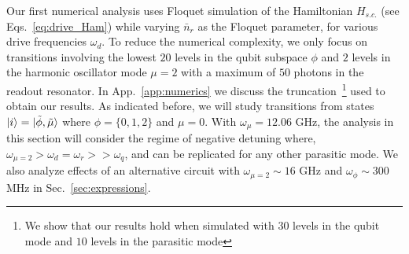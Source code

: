 \documentclass[%
reprint,
superscriptaddress,
 amsmath,amssymb,
 aps,
 prx,
longbibliography,
floatfix,
]{revtex4-2}
\newcommand{\sh}[1]{{\color{orange}{{}[SS: #1]}}}%
\begin{document}
Our first numerical analysis uses Floquet simulation of the Hamiltonian $H_{s.c.}$ (see Eqs.~\ref{eq:drive_Ham}) while varying $\bar n_r$ as the Floquet parameter, for various drive frequencies $\omega_d$. To reduce the numerical complexity, we only focus on transitions involving the lowest $20$ levels in the qubit subspace $\phi$ and $2$ levels in the harmonic oscillator mode $\mu=2$ with a maximum of $50$ photons in the readout resonator. In App.~\ref{app:numerics} we discuss the truncation~\footnote{We show that our results hold when simulated with $30$ levels in the qubit mode and $10$ levels in the parasitic mode} used to obtain our results. %
As indicated before, we will study transitions from states $\ket{i} =\ket{\tilde{\phi}, \tilde{\mu}}$ where $\phi=\{0,1,2\}$ and $\mu=0$. With $\omega_\mu=12.06$ GHz, the analysis in this section will consider the regime of negative detuning where, $\omega_{\mu=2}>\omega_d=\omega_r>>\omega_q$, and can be replicated for any other parasitic mode. We also analyze effects of an alternative circuit with $\omega_{\mu=2}\sim 16$ GHz and $\omega_\phi\sim 300$ MHz in Sec.~\ref{sec:expressions}.
\end{document}
